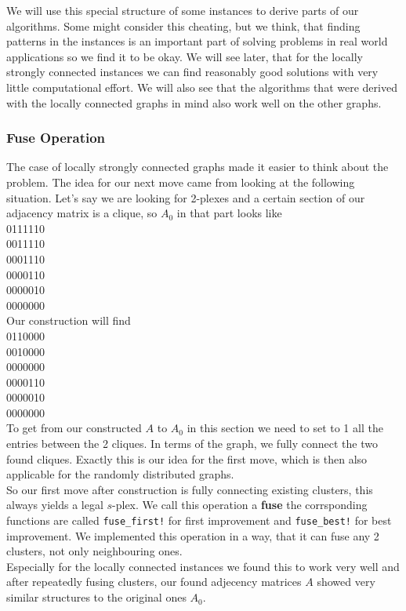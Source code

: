 We will use this special structure of some instances to derive parts of our algorithms. Some might consider this cheating, but we think, that finding patterns in the instances is an important part of solving problems in real world applications so we find it to be okay. We will see later, that for the locally strongly connected instances we can find reasonably good solutions with very little computational effort. We will also see that the algorithms that were derived with the locally connected graphs in mind also work well on the other graphs.\\

\subsubsection{Fuse Operation}
The case of locally strongly connected graphs made it easier to think about the problem. The idea for our next move came from looking at the following situation. Let's say we are looking for 2-plexes and a certain section of our adjacency matrix is a clique, so $A_0$ in that part looks like\\
0111110\\
0011110\\
0001110\\
0000110\\
0000010\\
0000000\\
Our construction will find\\
0110000\\
0010000\\
0000000\\
0000110\\
0000010\\
0000000\\
To get from our constructed $A$ to $A_0$ in this section we need to set to 1 all the entries between the 2 cliques. In terms of the graph, we fully connect the two found cliques. Exactly this is our idea for the first move, which is then also applicable for the randomly distributed graphs.\\
So our first move after construction is fully connecting existing clusters, this always yields a legal $s$-plex. We call this operation a \textbf{fuse} the corrsponding functions are called \texttt{fuse\_first!} for first improvement and \texttt{fuse\_best!} for best improvement. We implemented this operation in a way, that it can fuse any 2 clusters, not only neighbouring ones.\\
Especially for the locally connected instances we found this to work very well and after repeatedly fusing clusters, our found adjecency matrices $A$ showed very similar structures to the original ones $A_0$.\\

